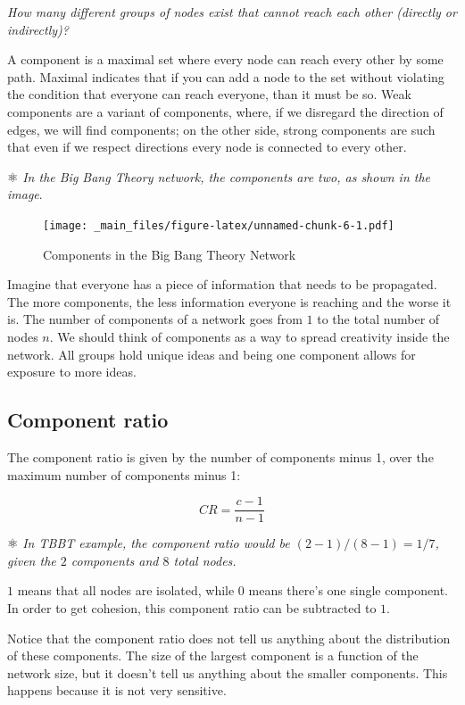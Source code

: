 \documentclass[
  notitlepage,
  onecolumn,
  openany]{book}
\begin{document}
\emph{How many different groups of nodes exist that cannot reach each other (directly or indirectly)?}

A component is a maximal set where every node can reach every other by some path. Maximal indicates that if you can add a node to the set without violating the condition that everyone can reach everyone, than it must be so. Weak components are a variant of components, where, if we disregard the direction of edges, we will find components; on the other side, strong components are such that even if we respect directions every node is connected to every other.

⚛️ \emph{In the Big Bang Theory network, the components are two, as shown in the image}.

\begin{figure}
\centering
\texttt{[image: \_main\_files/figure-latex/unnamed-chunk-6-1.pdf]}
\caption{\label{fig:unnamed-chunk-6}Components in the Big Bang Theory Network}
\end{figure}

Imagine that everyone has a piece of information that needs to be propagated. The more components, the less information everyone is reaching and the worse it is. The number of components of a network goes from \(1\) to the total number of nodes \(n\). We should think of components as a way to spread creativity inside the network. All groups hold unique ideas and being one component allows for exposure to more ideas.

\hypertarget{component-ratio}{%
\subsection{Component ratio}\label{component-ratio}}

The component ratio is given by the number of components minus 1, over the maximum number of components minus 1:

\[
CR = \frac{c-1}{n-1}
\]

⚛️ \emph{In TBBT example, the component ratio would be \((2-1)/(8-1) = 1/7\), given the \(2\) components and \(8\) total nodes.}

\(1\) means that all nodes are isolated, while \(0\) means there's one single component. In order to get cohesion, this component ratio can be subtracted to \(1\).

Notice that the component ratio does not tell us anything about the distribution of these components. The size of the largest component is a function of the network size, but it doesn't tell us anything about the smaller components. This happens because it is not very sensitive.
\end{document}
